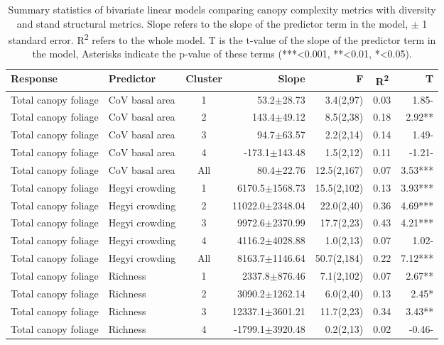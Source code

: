 \begin{longtable}{llcrrS[table-format=1.2]r}
\caption{Summary statistics of bivariate linear models comparing canopy complexity metrics with diversity and stand structural metrics. Slope refers to the slope of the predictor term in the model, $\pm{}$ 1 standard error. R\textsuperscript{2} refers to the whole model. T is the t-value of the slope of the predictor term in the model, Asterisks indicate the p-value of these terms (***<0.001, **<0.01, *<0.05).} \\ 
  \toprule
  {Response} & {Predictor} & {Cluster} & {Slope} & {F} & {R\textsuperscript{2}} & {T} \\ 
  \midrule
Total canopy foliage & CoV basal area & 1 & 53.2$\pm$28.73 & 3.4(2,97) & 0.03 & 1.85- \\ 
  Total canopy foliage & CoV basal area & 2 & 143.4$\pm$49.12 & 8.5(2,38) & 0.18 & 2.92** \\ 
  Total canopy foliage & CoV basal area & 3 & 94.7$\pm$63.57 & 2.2(2,14) & 0.14 & 1.49- \\ 
  Total canopy foliage & CoV basal area & 4 & -173.1$\pm$143.48 & 1.5(2,12) & 0.11 & -1.21- \\ 
  Total canopy foliage & CoV basal area & All & 80.4$\pm$22.76 & 12.5(2,167) & 0.07 & 3.53*** \\ 
   \midrule
Total canopy foliage & Hegyi crowding & 1 & 6170.5$\pm$1568.73 & 15.5(2,102) & 0.13 & 3.93*** \\ 
  Total canopy foliage & Hegyi crowding & 2 & 11022.0$\pm$2348.04 & 22.0(2,40) & 0.36 & 4.69*** \\ 
  Total canopy foliage & Hegyi crowding & 3 & 9972.6$\pm$2370.99 & 17.7(2,23) & 0.43 & 4.21*** \\ 
  Total canopy foliage & Hegyi crowding & 4 & 4116.2$\pm$4028.88 & 1.0(2,13) & 0.07 & 1.02- \\ 
  Total canopy foliage & Hegyi crowding & All & 8163.7$\pm$1146.64 & 50.7(2,184) & 0.22 & 7.12*** \\ 
   \midrule
Total canopy foliage & Richness & 1 & 2337.8$\pm$876.46 & 7.1(2,102) & 0.07 & 2.67** \\ 
  Total canopy foliage & Richness & 2 & 3090.2$\pm$1262.14 & 6.0(2,40) & 0.13 & 2.45* \\ 
  Total canopy foliage & Richness & 3 & 12337.1$\pm$3601.21 & 11.7(2,23) & 0.34 & 3.43** \\ 
  Total canopy foliage & Richness & 4 & -1799.1$\pm$3920.48 & 0.2(2,13) & 0.02 & -0.46- \\ 

\end{longtable}
